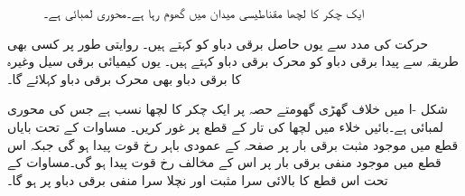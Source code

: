 \begin{figure}
\begin{subfigure}{0.45\textwidth}
\caption{}
\end{subfigure}
\caption{ایک چکر کا لچھا مقناطیسی میدان میں گھوم رہا ہے۔محوری لمبائی  ہے۔}
\label{شکل_گھومتے_مشین_ایک_چکر_کی_پیدا_دباو}
\end{figure}

 حرکت کی مدد سے یوں حاصل برقی دباو کو   کہتے ہیں۔ روایتی طور پر کسی بھی طریقہ سے پیدا برقی دباو کو محرک برقی دباو کہتے ہیں۔ یوں کیمیائی برقی سیل وغیرہ کا برقی دباو بھی محرک برقی دباو کہلائے  گا۔

شکل -ا میں خلاف گھڑی گھومتے حصہ پر ایک چکر کا لچھا نسب ہے جس کی محوری لمبائی  ہے۔بائیں خلاء میں لچھا کی  تار کے قطع پر غور کریں۔ مساوات   کے تحت بایاں قطع میں موجود مثبت برقی بار پر صفحہ کے عمودی باہر رخ قوت پیدا ہو گی جبکہ اس قطع میں موجود منفی برقی بار پر اس کے مخالف رخ قوت پیدا ہو گی۔مساوات   کے تحت اس قطع کا بالائی  سرا مثبت   اور نچلا سرا منفی برقی دباو پر ہو گا۔

